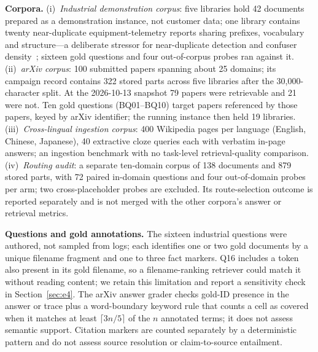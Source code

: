 \textbf{Corpora.} (i)~\emph{Industrial demonstration corpus}: five libraries
hold 42 documents prepared as a demonstration instance, not customer data; one
library contains twenty near-duplicate
equipment-telemetry reports sharing prefixes, vocabulary and structure---a
deliberate stressor for near-duplicate detection and confuser
density~\cite{manku-near-dup-2007}; sixteen gold questions and four
out-of-corpus probes ran against it. (ii)~\emph{arXiv corpus}: 100 submitted
papers spanning about 25 domains; its campaign record contains 322 stored
parts across five libraries after the 30{,}000-character split. At the
2026-10-13 snapshot
79 papers were retrievable and 21 were not. Ten gold questions (BQ01--BQ10) target papers referenced by those
papers, keyed by arXiv identifier; the running instance then held 19 libraries. (iii)~\emph{Cross-lingual
ingestion corpus}: 400 Wikipedia pages per language (English, Chinese,
Japanese), 40 extractive cloze queries each with verbatim in-page answers;
an ingestion benchmark with no task-level retrieval-quality comparison.
(iv)~\emph{Routing
audit}: a separate ten-domain corpus of 138 documents and 879 stored parts,
with 72 paired in-domain questions and four out-of-domain probes per arm;
two cross-placeholder probes are excluded. Its route-selection outcome is
reported separately and is not merged with the other corpora's answer or
retrieval metrics.

\textbf{Questions and gold annotations.} The sixteen industrial questions were
authored, not sampled from logs; each identifies one or two gold documents by
a unique filename fragment and one to three fact markers. Q16 includes a token
also present in its gold filename, so a filename-ranking retriever could match
it without reading content; we retain this limitation and report a sensitivity
check in Section~\ref{sec:e4}. The arXiv answer grader
checks gold-ID presence in the answer or trace plus a word-boundary keyword
rule that counts a cell as covered when it matches at least $\lceil 3n/5\rceil$
of the $n$ annotated terms; it does not assess semantic support. Citation
markers are counted separately by a deterministic pattern and do not assess
source resolution or claim-to-source entailment.

